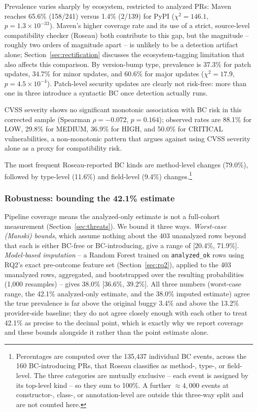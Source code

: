 \documentclass[10pt,journal]{IEEEtran}
\begin{document}
Prevalence varies sharply by ecosystem, restricted to analyzed PRs: Maven reaches 65.6\% (158/241) versus 1.4\% (2/139) for PyPI ($\chi^2=146.1$, $p=1.3\times10^{-33}$). Maven's higher coverage rate and its use of a strict, source-level compatibility checker (Roseau) both contribute to this gap, but the magnitude -- roughly two orders of magnitude apart -- is unlikely to be a detection artifact alone; Section~\ref{sec:rectification} discusses the ecosystem-tagging limitation that also affects this comparison. By version-bump type, prevalence is 37.3\% for patch updates, 34.7\% for minor updates, and 60.6\% for major updates ($\chi^2=17.9$, $p=4.5\times10^{-4}$). Patch-level security updates are clearly not risk-free: more than one in three introduce a syntactic BC once detection actually runs.

CVSS severity shows no significant monotonic association with BC risk in this corrected sample (Spearman $\rho=-0.072$, $p=0.164$); observed rates are 88.1\% for LOW, 29.8\% for MEDIUM, 36.9\% for HIGH, and 50.0\% for CRITICAL vulnerabilities, a non-monotonic pattern that argues against using CVSS severity alone as a proxy for compatibility risk.

The most frequent Roseau-reported BC kinds are method-level changes (79.0\%), followed by type-level (11.6\%) and field-level (9.4\%) changes.\footnote{Percentages are computed over the 135{,}437 individual BC events, across the 160 BC-introducing PRs, that Roseau classifies as method-, type-, or field-level. The three categories are mutually exclusive -- each event is assigned by its top-level kind -- so they sum to 100\%. A further ${\approx}4{,}000$ events at constructor-, class-, or annotation-level are outside this three-way split and are not counted here.}

\subsubsection{Robustness: bounding the 42.1\% estimate}
\label{sec:robustness}
Pipeline coverage means the analyzed-only estimate is not a full-cohort measurement (Section~\ref{sec:threats}). We bound it three ways. \emph{Worst-case (Manski) bounds}, which assume nothing about the 403 unanalyzed rows beyond that each is either BC-free or BC-introducing, give a range of [20.4\%, 71.9\%]. \emph{Model-based imputation} -- a Random Forest trained on \texttt{analyzed\_ok} rows using RQ2's exact pre-outcome feature set (Section~\ref{sec:rq2}), applied to the 403 unanalyzed rows, aggregated, and bootstrapped over the resulting probabilities (1{,}000 resamples) -- gives 38.0\% [36.6\%, 39.2\%]. All three numbers (worst-case range, the 42.1\% analyzed-only estimate, and the 38.0\% imputed estimate) agree the true prevalence is far above the original buggy 3.4\% and above the 13.2\% provider-side baseline; they do not agree closely enough with each other to treat 42.1\% as precise to the decimal point, which is exactly why we report coverage and these bounds alongside it rather than the point estimate alone.
\end{document}
